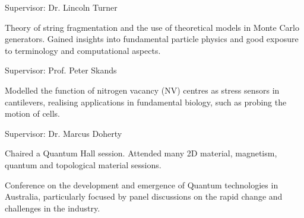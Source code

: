 \documentclass[10pt,a4paper,ragged2e,withhyper]{altacv}
\begin{document}
		\faUsers Supervisor: Dr. Lincoln Turner
		
		\divider
		
		\vspace{-0.2em}
		Theory of string fragmentation and the use of theoretical models in Monte Carlo generators. Gained insights into fundamental particle physics and good exposure to terminology and computational aspects.
		
		\faUsers Supervisor: Prof. Peter Skands
		
		\divider
		
		\vspace{-0.2em}
		Modelled the function of nitrogen vacancy (NV) centres as stress sensors in cantilevers, realising applications in fundamental biology, such as probing the motion of cells.
		
		\faUsers Supervisor: Dr. Marcus Doherty
		
	\divider
	
	
		Chaired a Quantum Hall session. Attended many 2D material, magnetism, quantum and topological material sessions. 
		
		\divider
		
		Conference on the development and emergence of Quantum technologies in Australia, particularly focused by panel discussions on the rapid change and challenges in the industry.
		
\end{document}
